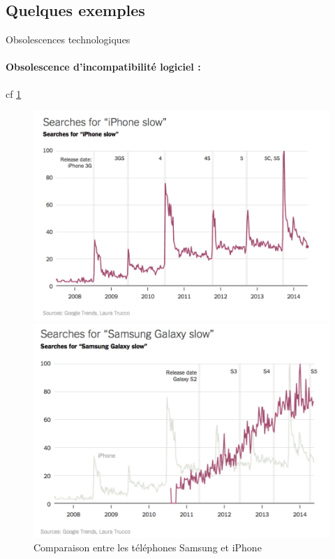\subsection{Quelques exemples}


Obsolescences technologiques

\paragraph*{Obsolescence d’incompatibilité logiciel :}

cf \ref{compSamsIph}
\begin{figure}[h]

\begin{minipage}{0.5\linewidth}
\includegraphics[scale=0.25]{Rsc/searchForIphoneSlow.png} 
\end{minipage}
\begin{minipage}{0.5\linewidth}
\includegraphics[scale=0.25]{Rsc/searchForSamsungSlow.png} 
\end{minipage}
\caption{Comparaison entre les téléphones Samsung et iPhone}
\label{compSamsIph}
\end{figure}

